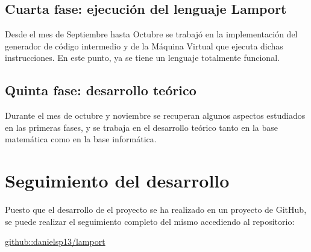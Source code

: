 \subsection{Cuarta fase: ejecución del lenguaje Lamport}
Desde el mes de Septiembre hasta Octubre se trabajó en la implementación del generador de código intermedio y de la Máquina Virtual que ejecuta dichas instrucciones. En este punto, ya se tiene un lenguaje totalmente funcional.

\subsection{Quinta fase: desarrollo teórico}
Durante el mes de octubre y noviembre se recuperan algunos aspectos estudiados en las primeras fases, y se trabaja en el desarrollo teórico tanto en la base matemática como en la base informática.



\section{Seguimiento del desarrollo}
Puesto que el desarrollo de el proyecto se ha realizado en un proyecto de GitHub, se puede realizar el seguimiento completo del mismo accediendo al repositorio:

\begin{center}
    \href{https://github.com/danielsp13/lamport}{github::danielsp13/lamport}
\end{center}